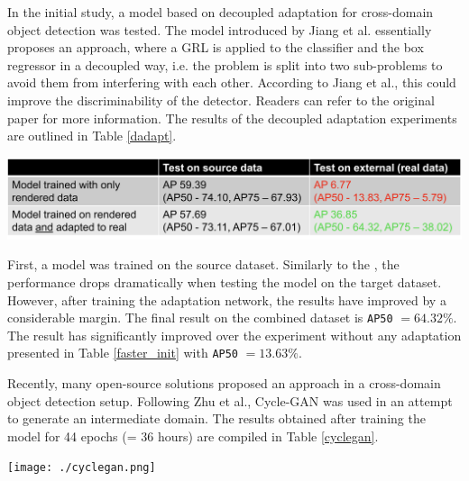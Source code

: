 In the initial study, a model based on decoupled adaptation for cross-domain object detection \cite{Jiang2021} was tested. The model introduced by Jiang et al. essentially proposes an  approach, where a GRL is applied to the classifier and the box regressor in a decoupled way, i.e. the problem is split into two sub-problems to avoid them from interfering with each other. According to Jiang et al., this could improve the discriminability of the detector. Readers can refer to the original paper \cite{Jiang2021} for more information. The results of the decoupled adaptation experiments are outlined in Table \ref{dadapt}.

\begin{table}[htb]
	\begin{center}
		\includegraphics[width=14cm]{./dadapt.png}
	\end{center}
	\begin{center}
		\label{dadapt}
	\end{center}
\end{table}

First, a model was trained on the source dataset. Similarly to the , the performance drops dramatically when testing the model on the target dataset. However, after training the adaptation network, the results have improved by a considerable margin. The final result on the combined dataset is \texttt{AP50} $= 64.32\%$. The result has significantly improved over the experiment without any adaptation presented in Table \ref{faster_init} with \texttt{AP50} $= 13.63\%$. 

Recently, many open-source solutions proposed \cite{Inoue_2018_CVPR, Chen2020, Arruda2019} an  approach in a cross-domain object detection setup. Following Zhu et al., Cycle-GAN \cite{Zhu2017} was used in an attempt to generate an intermediate domain. The results obtained after training the model for 44 epochs (= 36 hours) are compiled in Table \ref{cyclegan}.  

\begin{table}[htb]
	\begin{center}
		\texttt{[image: ./cyclegan.png]}
	\end{center}
	\begin{center}
		\label{cyclegan}
	\end{center}
\end{table}

